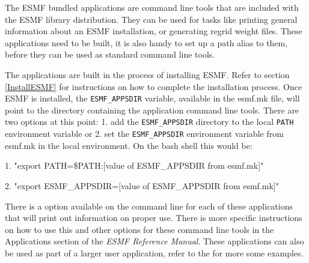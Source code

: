 
The ESMF bundled applications are command line tools that are included
with the ESMF library distribution.  They can be used for tasks like
printing general information about an ESMF installation, or generating
regrid weight files.  These applications need to be built, it is also
handy to set up a path alias to them, before they 
can be used as standard command line tools.

The applications are built in the process of installing ESMF.  Refer 
to section \ref{InstallESMF} for instructions on how to complete the 
installation process.  Once ESMF is installed, the {\tt ESMF\_APPSDIR} 
variable, available in the esmf.mk file,
will point to the directory containing the application command line 
tools.  There are two options at this point: 1. add the {\tt ESMF\_APPSDIR}
directory to the local {\tt PATH} environment variable or 2. set the 
{\tt ESMF\_APPSDIR} environment variable from esmf.mk in the local 
environment.  On the bash shell this would be:

1. "export PATH=\$PATH:[value of ESMF\_APPSDIR from esmf.mk]"

2. "export ESMF\_APPSDIR=[value of ESMF\_APPSDIR from esmf.mk]"

There is a  option available on the command line for each 
of these applications that will print out information on proper use.  
There is more specific instructions on how to use
this and other options for these command line tools in the Applications section
of the {\it ESMF Reference Manual}.  These applications can
also be used as part of a larger user application, refer to the 
for more some examples.  
